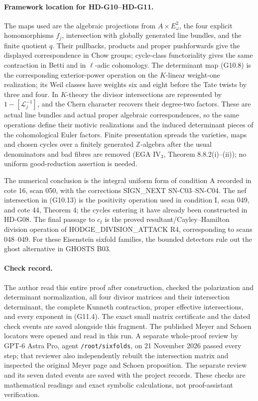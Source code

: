\paragraph{Framework location for HD-G10--HD-G11.}
The maps used are the algebraic projections from $A\times E_\omega^2$,
the four explicit homomorphisms $f_j$, intersection with globally
generated line bundles, and the finite quotient $q$.
Their pullbacks, products and proper pushforwards give the displayed
correspondence in Chow groups; cycle-class functoriality gives the
same contraction in Betti and in $\ell$-adic cohomology.
The determinant map (G10.8) is the corresponding exterior-power
operation on the $K$-linear weight-one realization; its Weil
classes have weights six and eight before the Tate twists by three
and four. In $K$-theory the divisor intersections are represented
by $1-[\mathcal L_j^{-1}]$, and the Chern character recovers their
degree-two factors. These are actual line bundles and actual
proper algebraic correspondences, so the same operations define
their motivic realizations and the induced determinant pieces of
the cohomological Euler factors. Finite presentation spreads the
varieties, maps and chosen cycles over a finitely generated
$\mathbb Z$-algebra after the usual denominators and bad fibres
are removed (EGA IV$_3$, Theorem 8.8.2(i)--(ii)); no uniform
good-reduction assertion is needed.

The numerical conclusion is the integral uniform form of condition A
recorded in cote 16, scan 050, with the corrections SIGN\_NEXT
SN-C03--SN-C04. The nef intersection in (G10.13) is the positivity
operation used in condition I, scan 049, and cote 44, Theorem 4;
the cycles entering it have already been constructed in HD-G08.
The final passage to $c_t$ is the proved resultant/Cayley--Hamilton
division operation of HODGE\_DIVISION\_ATTACK R4, corresponding
to scans 048--049. For these Eisenstein sixfold families, the
bounded detectors rule out the ghost alternative in GHOSTS B03.

\paragraph{Check record.}
The author read this entire proof after construction, checked the
polarization and determinant normalization, all four divisor matrices
and their intersection determinant, the complete Kunneth contraction,
proper effective intersections, and every exponent in (G11.4).
The exact small matrix certificate and the dated check events are
saved alongside this fragment. The published Meyer and Schoen
locators were opened and read in this run. A separate whole-proof
review by GPT-6 Astra Pro, agent \texttt{/root/sixfolds}, on
21 November 2026 passed every step; that reviewer also independently
rebuilt the intersection matrix and inspected the original Meyer page
and Schoen proposition. The separate review and its seven dated events
are saved with the project records. These checks are mathematical
readings and exact symbolic calculations, not proof-assistant verification.
